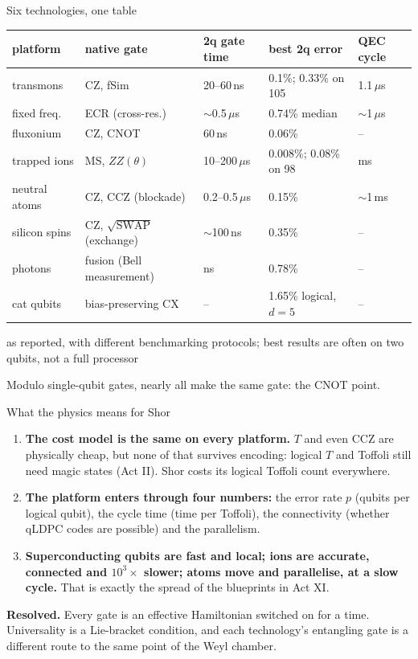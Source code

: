 \documentclass[aspectratio=169,11pt]{beamer}
\newcommand{\resolved}[1]{\begin{takeaway}\textbf{Resolved.} #1\end{takeaway}}
\begin{document}
\begin{frame}{Six technologies, one table}
  \centering\small
  \setlength{\tabcolsep}{5pt}
  \renewcommand{\arraystretch}{1.3}
  \begin{tabular}{@{}lllll@{}}
    \toprule
    platform & native gate & 2q gate time & best 2q error & QEC cycle \\
    \midrule
    transmons & CZ, fSim & 20--60\,ns & 0.1\%; 0.33\% on 105 & 1.1\,$\mu$s \\
    \quad fixed freq. & ECR (cross-res.) & $\sim$0.5\,$\mu$s & 0.74\% median & $\sim$1\,$\mu$s \\
    \quad fluxonium & CZ, CNOT & 60\,ns & 0.06\% & -- \\
    trapped ions & MS, $ZZ(\theta)$ & 10--200\,$\mu$s & 0.008\%; 0.08\% on 98 & ms \\
    neutral atoms & CZ, CCZ (blockade) & 0.2--0.5\,$\mu$s & 0.15\% & $\sim$1\,ms \\
    silicon spins & CZ, $\sqrt{\mathrm{SWAP}}$ (exchange) & $\sim$100\,ns & 0.35\% & -- \\
    photons & fusion (Bell measurement) & ns & 0.78\% & -- \\
    cat qubits & bias-preserving CX & -- & 1.65\% logical, $d{=}5$ & -- \\
    \bottomrule
  \end{tabular}\par
  \vskip1mm
  {\scriptsize\color{subtle}as reported, with different benchmarking protocols; best results are often on two qubits, not a full processor}
  \begin{takeaway}Modulo single-qubit gates, nearly all make the same gate: the CNOT point.\end{takeaway}
\end{frame}

\begin{frame}{What the physics means for Shor}
  \begin{enumerate}\setlength{\itemsep}{2mm}
    \item \textbf{The cost model is the same on every platform.} $T$ and even CCZ are physically cheap, but none of that survives encoding: logical $T$ and Toffoli still need magic states (Act II). Shor costs its logical Toffoli count everywhere.
    \item \textbf{The platform enters through four numbers:} the error rate $p$ (qubits per logical qubit), the cycle time (time per Toffoli), the connectivity (whether qLDPC codes are possible) and the parallelism.
    \item \textbf{Superconducting qubits are fast and local; ions are accurate, connected and $10^3\times$ slower; atoms move and parallelise, at a slow cycle.} That is exactly the spread of the blueprints in Act XI.
  \end{enumerate}
  \resolved{Every gate is an effective Hamiltonian switched on for a time. Universality is a Lie-bracket condition, and each technology's entangling gate is a different route to the same point of the Weyl chamber.}
\end{frame}
\end{document}
